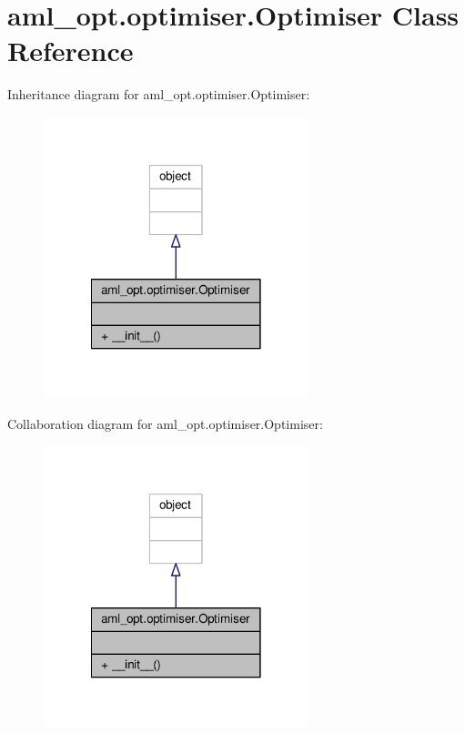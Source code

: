 \hypertarget{classaml__opt_1_1optimiser_1_1_optimiser}{\section{aml\-\_\-opt.\-optimiser.\-Optimiser Class Reference}
\label{classaml__opt_1_1optimiser_1_1_optimiser}
}


Inheritance diagram for aml\-\_\-opt.\-optimiser.\-Optimiser\-:\nopagebreak
\begin{figure}[H]
\begin{center}
\leavevmode
\includegraphics[width=218pt]{classaml__opt_1_1optimiser_1_1_optimiser__inherit__graph}
\end{center}
\end{figure}


Collaboration diagram for aml\-\_\-opt.\-optimiser.\-Optimiser\-:\nopagebreak
\begin{figure}[H]
\begin{center}
\leavevmode
\includegraphics[width=218pt]{classaml__opt_1_1optimiser_1_1_optimiser__coll__graph}
\end{center}
\end{figure}
